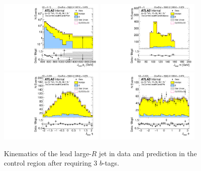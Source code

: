\clearpage

\begin{figure}[htbp!]
\begin{center}
\includegraphics[angle=270, width=0.45\textwidth]{./figures/boosted/Control/b77_ThreeTag_Control_leadHCand_Pt_m_1.pdf}
\includegraphics[angle=270, width=0.45\textwidth]{./figures/boosted/Control/b77_ThreeTag_Control_leadHCand_Mass_s.pdf}\\
\includegraphics[angle=270, width=0.45\textwidth]{./figures/boosted/Control/b77_ThreeTag_Control_leadHCand_Eta.pdf}
\includegraphics[angle=270, width=0.45\textwidth]{./figures/boosted/Control/b77_ThreeTag_Control_leadHCand_Phi.pdf}
  \caption{Kinematics of the lead large-$R$ jet in data and prediction in the control region after requiring 3 $b$-tags. }
  \label{fig:boosted-3b-control-ak10-lead}
\end{center}
\end{figure}

